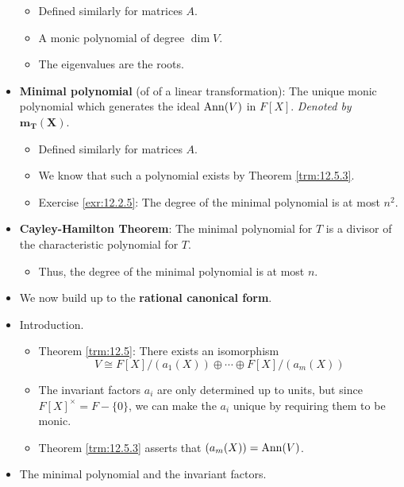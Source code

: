 \documentclass[../notes.tex]{subfiles}
\begin{document}
\begin{itemize}
    \begin{itemize}
        \item Defined similarly for matrices $A$.
        \item A monic polynomial of degree $\dim V$.
        \item The eigenvalues are the roots.
    \end{itemize}
    \item \textbf{Minimal polynomial} (of of a linear transformation): The unique monic polynomial which generates the ideal $\operatorname{Ann}(V)$ in $F[X]$. \emph{Denoted by} $\bm{m_T(X)}$.
    \begin{itemize}
        \item Defined similarly for matrices $A$.
        \item We know that such a polynomial exists by Theorem \ref{trm:12.5.3}.
        \item Exercise \ref{exr:12.2.5}: The degree of the minimal polynomial is at most $n^2$.
    \end{itemize}
    \item \textbf{Cayley-Hamilton Theorem}: The minimal polynomial for $T$ is a divisor of the characteristic polynomial for $T$.
    \begin{itemize}
        \item Thus, the degree of the minimal polynomial is at most $n$.
    \end{itemize}
    \item We now build up to the \textbf{rational canonical form}.
    \item Introduction.
    \begin{itemize}
        \item Theorem \ref{trm:12.5}: There exists an isomorphism
        \begin{equation}\label{eqn:12.1}
            V \cong F[X]/(a_1(X))\oplus\cdots\oplus F[X]/(a_m(X))
        \end{equation}
        \item The invariant factors $a_i$ are only determined up to units, but since $F[X]^\times=F-\{0\}$, we can make the $a_i$ unique by requiring them to be monic.
        \item Theorem \ref{trm:12.5.3} asserts that $(a_m(X))=\operatorname{Ann}(V)$.
    \end{itemize}
    \item The minimal polynomial and the invariant factors.

\end{itemize}
\end{document}
